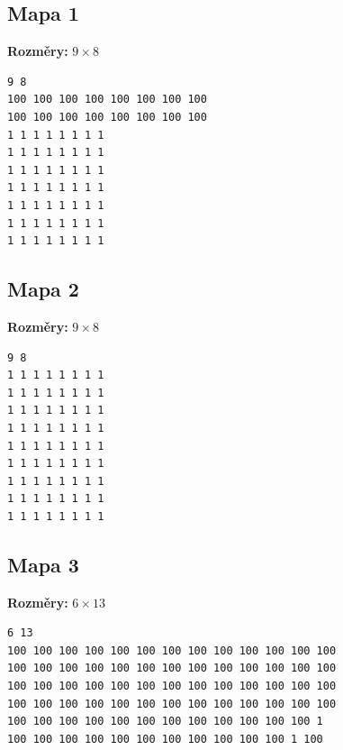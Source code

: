 \documentclass[11pt,a4paper]{article}
\begin{document}
\subsection*{Mapa 1}
\textbf{Rozměry:} $9 \times 8$
\begin{verbatim}
9 8
100 100 100 100 100 100 100 100
100 100 100 100 100 100 100 100
1 1 1 1 1 1 1 1
1 1 1 1 1 1 1 1
1 1 1 1 1 1 1 1
1 1 1 1 1 1 1 1
1 1 1 1 1 1 1 1
1 1 1 1 1 1 1 1
1 1 1 1 1 1 1 1
\end{verbatim}

\subsection*{Mapa 2}
\textbf{Rozměry:} $9 \times 8$
\begin{verbatim}
9 8
1 1 1 1 1 1 1 1
1 1 1 1 1 1 1 1
1 1 1 1 1 1 1 1
1 1 1 1 1 1 1 1
1 1 1 1 1 1 1 1
1 1 1 1 1 1 1 1
1 1 1 1 1 1 1 1
1 1 1 1 1 1 1 1
1 1 1 1 1 1 1 1
\end{verbatim}

\subsection*{Mapa 3}
\textbf{Rozměry:} $6 \times 13$
\begin{verbatim}
6 13
100 100 100 100 100 100 100 100 100 100 100 100 100
100 100 100 100 100 100 100 100 100 100 100 100 100
100 100 100 100 100 100 100 100 100 100 100 100 100
100 100 100 100 100 100 100 100 100 100 100 100 100
100 100 100 100 100 100 100 100 100 100 100 100 1
100 100 100 100 100 100 100 100 100 100 100 1 100
\end{verbatim}
\end{document}
